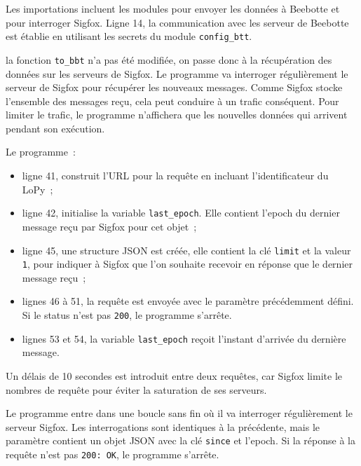 Les importations incluent les modules pour envoyer les données à Beebotte et pour interroger Sigfox. Ligne 14, la communication avec les serveur de Beebotte est établie en utilisant les secrets du module \texttt{config\_btt}.


la fonction \texttt{to\_bbt} n'a pas été modifiée, on passe donc à la récupération des données sur les serveurs de Sigfox. Le programme va interroger régulièrement le serveur de Sigfox pour récupérer les nouveaux messages. Comme Sigfox stocke l'ensemble des messages reçu, cela peut conduire à un trafic conséquent. Pour limiter le trafic, le programme n'affichera que les nouvelles données qui arrivent pendant son exécution. 

Le programme~:

\begin{itemize}
    \item ligne 41, construit l'URL pour la requête en incluant l'identificateur du LoPy~; 
    \item ligne 42, initialise la variable \texttt{last\_epoch}. Elle contient l'epoch du dernier message reçu par Sigfox pour cet objet~;
    \item ligne 45, une structure JSON est créée, elle contient la clé \texttt{limit} et la valeur \texttt{1}, pour indiquer à Sigfox que l'on souhaite recevoir en réponse que le dernier message reçu~;
    \item lignes 46 à 51, la requête est envoyée avec le paramètre précédemment défini. Si le status n'est pas \texttt{200}, le programme s'arrête.
    \item lignes 53 et 54, la variable \texttt{last\_epoch} reçoit l'instant d'arrivée du dernière message. 
\end{itemize}


Un délais de 10 secondes est introduit entre deux requêtes, car Sigfox limite le nombres de requête pour éviter la saturation de ses serveurs.



Le programme entre dans une boucle sans fin où il va interroger régulièrement le serveur Sigfox. Les interrogations sont identiques à la précédente, mais le paramètre contient un objet JSON avec la clé \texttt{since} et l'epoch. Si la réponse à la requête n'est pas \texttt{200: OK}, le programme s'arrête.


